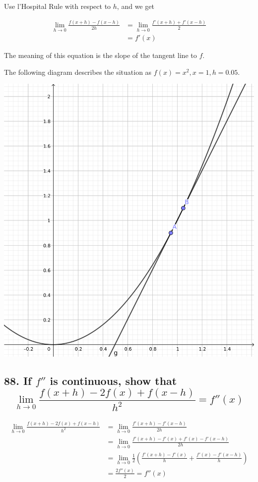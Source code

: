 \documentclass{article}
\begin{document}
    Use l'Hospital Rule with respect to $h$, and we get

    $$\begin{aligned}
        \lim_{h \to 0}\frac{f(x + h) - f(x - h)}{2h} &= \lim_{h \to 0}\frac{f'(x + h) + f'(x - h)}{2} \\
        &= f'(x)
    \end{aligned}$$

    The meaning of this equation is the slope of the tangent line to $f$.

    The following diagram describes the situation as $f(x) = x^2, x = 1, h = 0.05$.

    \includegraphics[scale=6]{87.png}

    \subsection*{88. If $f''$ is continuous, show that $$\lim_{h \to 0}\frac{f(x + h) - 2f(x) + f(x - h)}{h^2} = f''(x)$$}

    $$\begin{aligned}
        \lim_{h \to 0}\frac{f(x + h) - 2f(x) + f(x - h)}{h^2} &= \lim_{h \to 0}\frac{f'(x + h) - f'(x - h)}{2h} \\
        &= \lim_{h \to 0}\frac{f'(x + h) - f'(x) + f'(x) - f'(x - h)}{2h} \\
        &= \lim_{h \to 0}\frac 1 2(\frac{f'(x + h) - f'(x)}{h} + \frac{f'(x) - f'(x - h)}{h}) \\
        &= \frac{2f''(x)}{2} = f''(x)
    \end{aligned}$$
\end{document}
